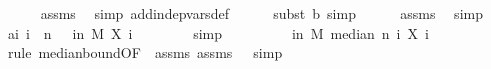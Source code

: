 \begin{isabellebody}
\ \ \ \ \isamarkupfalse%
\ assms{\isacharparenleft}{\kern0pt}{}{\isacharparenright}{\kern0pt}\ \isamarkupfalse%
\ {\isacharparenleft}{\kern0pt}simp\ add{\isacharcolon}{\kern0pt}indep{\isacharunderscore}{\kern0pt}vars{\isacharunderscore}{\kern0pt}def{\isacharparenright}{\kern0pt}\isanewline
\ \ \ \ \isamarkupfalse%
\ {\isacharparenleft}{\kern0pt}subst\ b{\isacharcomma}{\kern0pt}\ simp{\isacharparenright}{\kern0pt}\isanewline
\ \ \ \ \isamarkupfalse%
\ assms{\isacharparenleft}{\kern0pt}{}{\isacharparenright}{\kern0pt}\ \isamarkupfalse%
\ simp\isanewline
\isanewline
\ \ \isamarkupfalse%
\ a{\isacharcolon}{\kern0pt}{\isachardoublequoteopen}{\isasymAnd}i{\isachardot}{\kern0pt}\ i\ {\isacharless}{\kern0pt}\ n\ {\isasymLongrightarrow}\ {\isasymP}{\isacharparenleft}{\kern0pt}{\isasymomega}\ in\ M{\isachardot}{\kern0pt}\ X\ i\ {\isasymomega}\ {\isasymin}\ {\isacharbraceleft}{\kern0pt}{\isasymmu}{\isacharminus}{\kern0pt}\ {\isasymdelta}{\isachardot}{\kern0pt}{\isachardot}{\kern0pt}{\isasymmu}{\isacharplus}{\kern0pt}{\isasymdelta}{\isacharbraceright}{\kern0pt}{\isacharparenright}{\kern0pt}\ {\isasymge}\ {}{\isacharslash}{\kern0pt}{}{\isachardoublequoteclose}\ \isamarkupfalse%
\ simp\isanewline
\ \ \isanewline
\ \ \isamarkupfalse%
\ {\isachardoublequoteopen}{}{\isacharminus}{\kern0pt}{\isasymepsilon}\ {\isasymle}\ {\isasymP}{\isacharparenleft}{\kern0pt}{\isasymomega}\ in\ M{\isachardot}{\kern0pt}\ median\ n\ {\isacharparenleft}{\kern0pt}{\isasymlambda}i{\isachardot}{\kern0pt}\ X\ i\ {\isasymomega}{\isacharparenright}{\kern0pt}\ {\isasymin}\ {\isacharbraceleft}{\kern0pt}{\isasymmu}{\isacharminus}{\kern0pt}{\isasymdelta}{\isachardot}{\kern0pt}{\isachardot}{\kern0pt}{\isasymmu}{\isacharplus}{\kern0pt}{\isasymdelta}{\isacharbraceright}{\kern0pt}{\isacharparenright}{\kern0pt}{\isachardoublequoteclose}\isanewline
\ \ \ \ \isamarkupfalse%
\ {\isacharparenleft}{\kern0pt}rule\ median{\isacharunderscore}{\kern0pt}bound{\isacharunderscore}{\kern0pt}{}{\isacharbrackleft}{\kern0pt}OF\ {\isacharunderscore}{\kern0pt}\ assms{\isacharparenleft}{\kern0pt}{}{\isacharparenright}{\kern0pt}\ assms{\isacharparenleft}{\kern0pt}{}{\isacharparenright}{\kern0pt}{\isacharcomma}{\kern0pt}\ \ {\isasymalpha}{\isacharequal}{\kern0pt}{\isachardoublequoteopen}{}{\isacharslash}{\kern0pt}{}{\isachardoublequoteclose}{\isacharbrackright}{\kern0pt}{\isacharcomma}{\kern0pt}\ simp{\isacharparenright}{\kern0pt}\ \isanewline

\end{isabellebody}
